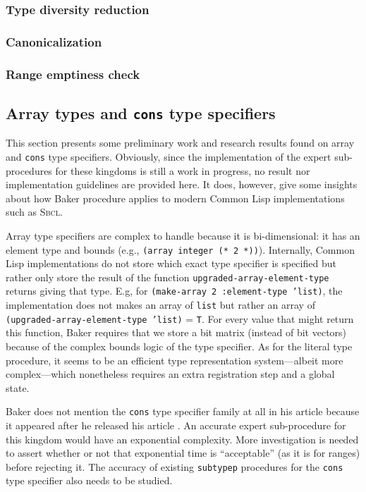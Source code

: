 \documentclass[format=sigconf]{acmart}
\newcommand\code[2][\small]{\sloppy\texttt{#1#2}}
\theoremstyle{definition}
\newcommand\sbcl{\textsc{Sbcl}}
\begin{document}
\subsubsection{Type diversity reduction}
\subsubsection{Canonicalization}
\subsubsection{Range emptiness check}


\subsection{Array types and \code[\large]{cons} type specifiers}
\label{sec:expoth}
This section presents some preliminary work and research results found on array
and \code{cons} type specifiers. Obviously, since the implementation of the
expert sub-procedures for these kingdoms is still a work in progress, no result
nor implementation guidelines are provided here. It does, however, give some
insights about how Baker procedure applies to modern Common Lisp implementations
such as \sbcl.

Array type specifiers are complex to handle because it is bi-dimensional: it
has an element type and bounds (e.g., \code{(array integer (* 2 *))}).
Internally, Common Lisp implementations do not store which exact type
specifier is specified but rather only store the result of the function
\code{upgraded-array-element-type} returns giving that type. E.g, for
\code{(make-array 2 :element-type 'list)}, the implementation does not makes an
array of \code{list} but rather an array of \code{(upgraded-array-element-type
  'list)} = \code{T}. For every value that might return this function, Baker
requires that we store a bit matrix (instead of bit vectors) because of the
complex bounds logic of the type specifier. As for the literal type procedure,
it seems to be an efficient type representation system---albeit more
complex---which nonetheless requires an extra registration step and a global
state.

Baker does not mention the \code{cons} type specifier family at all in his
article because it appeared after he released his article \cite{gcl-devel.cons}.
An accurate expert sub-procedure for this kingdom would have an exponential
complexity. More investigation is needed to assert whether or not that
exponential time is ``acceptable'' (as it is for ranges) before rejecting it.
The accuracy of existing \code{subtypep} procedures for the \code{cons} type
specifier also needs to be studied.
\end{document}
